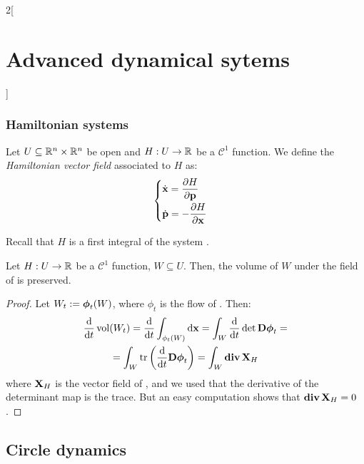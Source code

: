\documentclass[../../../main_math.tex]{subfiles}
\begin{document}
\begin{multicols}{2}[\section{Advanced dynamical sytems}]
  \subsubsection{Hamiltonian systems}
  \begin{definition}
    Let $U\subseteq \mathbb{R}^n\times \mathbb{R}^n$ be open and $H:U\rightarrow \mathbb{R}$ be a $\mathcal{C}^1$ function. We define the \emph{Hamiltonian vector field} associated to $H$ as:
    \begin{equation}\label{ADS:ham_system}
      \begin{cases}
        \displaystyle\dot{\vf{x}}=\pdv{H}{\vf{p}}\vspace{0.1cm} \\
        \displaystyle\dot{\vf{p}}=-\pdv{H}{\vf{x}}
      \end{cases}
    \end{equation}
  \end{definition}
  \begin{remark}
    Recall that $H$ is a first integral of the system .
  \end{remark}
  \begin{lemma}
    Let $H:U\rightarrow \mathbb{R}$ be a $\mathcal{C}^1$ function, $W\subseteq U$. Then, the volume of $W$ under the field of  is preserved.
  \end{lemma}
  \begin{proof}
    Let $W_t:=\boldsymbol{\mathrm{\phi}}_t(W)$, where $\phi_t$ is the flow of . Then:
    \begin{multline*}
      \dv{}{t}\vol(W_t)=\dv{}{t}\int_{\phi_t(W)}\dd{\vf{x}}=\int_W\dv{}{t}\det \vf{D\phi}_t=\\
      =\int_W\trace\left(\dv{}{t}\vf{D\phi}_t\right)=\int_W\div \vf{X}_H
    \end{multline*}
    where $\boldsymbol{\mathrm{X}}_H$ is the vector field of , and  we used that the derivative of the determinant map is the trace. But an easy computation shows that $\operatorname{\boldsymbol{\mathrm{div}}} \boldsymbol{\mathrm{X}}_H=0$.
  \end{proof}
  \subsection{Circle dynamics}

\end{multicols}
\end{document}
